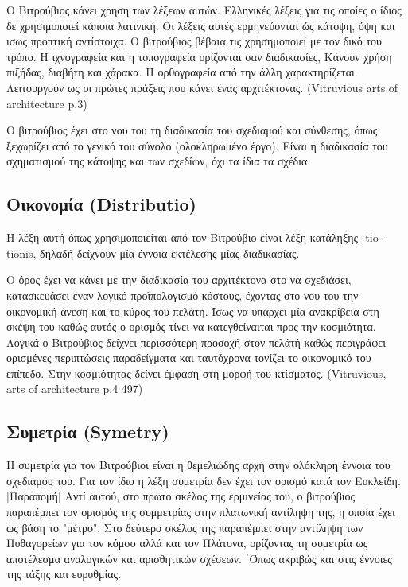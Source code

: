   Ο Βιτρούβιος κάνει χρηση των λέξεων αυτών. Ελληνικές λέξεις για τις οποίες ο ίδιος δε χρησιμοποιεί κάποια λατινική. Οι λέξεις αυτές ερμηνεύονται ώς κάτοψη, όψη και ισως προπτική αντίστοιχα. Ο βιτρούβιος βέβαια τις χρησημοποιεί με τον δικό του τρόπο. Η ιχνογραφεία και η τοπογραφεία ορίζονται σαν διαδικασίες, Κάνουν χρήση πιξήδας, διαβήτη και χάρακα. Η ορθογραφεία από την άλλη χαρακτηρίζεται. Λειτουργούν ως οι πρώτες πράξεις που κάνει ένας αρχιτέκτονας. (Vitruvious arts of architecture p.3)
  
  Ο βιτρούβιος έχει στο νου του τη διαδικασία του σχεδιαμού και σύνθεσης, όπως ξεχωρίζει από το γενικό του σύνολο (ολοκληρωμένο έργο). Είναι η διαδικασία του σχηματισμού της κάτοψης και των σχεδίων, όχι τα ίδια τα σχέδια.
  
\subsection{Οικονομία (Distributio)}

  Η λέξη αυτή όπως χρησιμοποιείται από τον Βιτρούβιο είναι λέξη κατάληξης -tio -tionis, δηλαδή δείχνουν μία έννοια εκτέλεσης μίας διαδικασίας.
  
  Ο όρος έχει να κάνει με την διαδικασία του αρχιτέκτονα στο να σχεδιάσει, κατασκευάσει έναν λογικό προϊπολογισμό κόστους, έχοντας στο νου του την οικονομική άνεση και το κύρος του πελάτη. Ίσως να υπάρχει μία ανακρίβεια στη σκέψη του καθώς αυτός ο ορισμός τίνει να κατεγθείναιται προς την κοσμιότητα. Λογικά ο Βιτρούβιος δείχνει περισσότερη προσοχή στον πελάτή καθώς περιγράφει ορισμένες περιπτώσεις παραδείγματα και ταυτόχρονα τονίζει το οικονομικό του επίπεδο. Στην κοσμιότητας δείνει έμφαση στη μορφή του κτίσματος. (Vitruvious, arts of architecture p.4 497)
  
\subsection{Συμετρία (Symetry)}

  Η συμετρία για τον Βιτρούβιοι είναι η θεμελιώδης αρχή στην ολόκληρη έννοια του σχεδιαμόυ του. Για τον ίδιο η λέξη συμετρία δεν έχει τον ορισμό κατά τον Ευκλείδη. [Παραπομή] Αντί αυτού, στο πρωτο σκέλος της ερμινείας του, ο βιτρούβιος παραπέμπει τον ορισμός της συμμετρίας στην πλατωνική αντίληψη της, η οποία έχει ως βάση το "μέτρο". Στο δεύτερο σκέλος της παραπέμπει στην αντίληψη των Πυθαγορείων για τον κόμσο αλλά και τον Πλάτονα, ορίζοντας τη συμετρία ως αποτέλεσμα αναλογικών και αρισθητικών σχέσεων. ΄Όπως ακριβώς και στις έννοιες της τάξης και ευρυθμίας. \Cite[σ.~51,96]{vitruvius-lefas}


